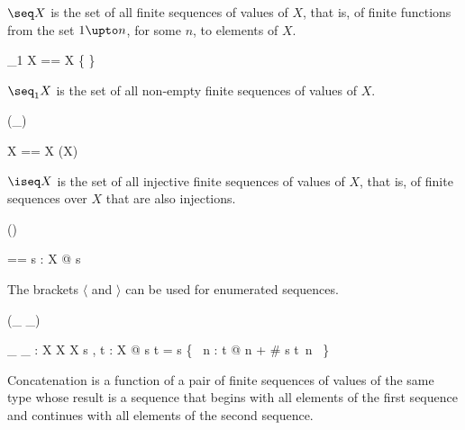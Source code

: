 \documentclass[draft,a4paper,10pt,wd]{isov2}
\begin{document}
$\seq X$ is the set of all finite sequences of values of $X$,
that is, of finite functions from the set $1 \upto n$,
for some $n$, to elements of $X$.


\begin{zed}
\seq_1 X == \seq X \setminus \{ \emptyset \}
\end{zed}

$\seq_1 X$ is the set of all non-empty finite sequences of values of $X$.


\begin{zed}
\generic (\iseq \_)
\end{zed}

\begin{zed}
\iseq X == \seq X \cap (\nat \pinj X)
\end{zed}

$\iseq X$ is the set of all injective finite sequences of values of $X$,
that is, of finite sequences over $X$ that are also injections.


\begin{zed}
\function (\langle \listarg \rangle)
\end{zed}

\begin{zed}
\langle \listarg \rangle [ X ]  == \lambda s : \seq X @ s
\end{zed}

The brackets $\langle$ and $\rangle$ can be used for enumerated sequences.


\begin{zed}
 \leftassoc (\_ \cat \_)
\end{zed}


\begin{gendef}[X]
\_ \cat \_ : \seq X \cross \seq X \fun \seq X
\where
\forall s , t : \seq X @
s \cat t = s \cup \{~ n : \dom t @ n + \# s \mapsto t~n ~\}
\end{gendef}

Concatenation is a function of a pair of finite sequences of
values of the same type whose result is a sequence that
begins with all elements of the first sequence and
continues with all elements of the second sequence.
\end{document}
